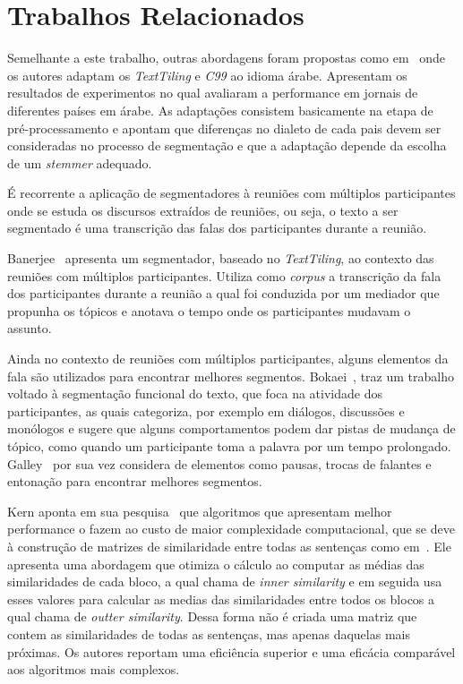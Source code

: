 \section{Trabalhos Relacionados}
	\label{sec:trabalhos}


Semelhante a este trabalho, outras abordagens foram propostas como em~\cite{CHAIBI2014} onde os autores adaptam os \textit{TextTiling} e \textit{C99} ao idioma árabe. Apresentam os resultados de experimentos no qual avaliaram a performance em jornais de diferentes países em árabe. As adaptações consistem basicamente na etapa de pré-processamento e apontam que diferenças no dialeto de cada pais devem ser consideradas no processo de segmentação e que a adaptação depende da escolha de um \textit{stemmer} adequado.

É recorrente a aplicação de segmentadores à reuniões com múltiplos participantes onde se estuda os discursos extraídos de reuniões, ou seja, o texto a ser segmentado é uma transcrição das falas dos participantes durante a reunião.
%


Banerjee~\cite{Banerjee2006} apresenta um segmentador, baseado no  \textit{TextTiling}, ao contexto das reuniões com múltiplos participantes. Utiliza como \textit{corpus} a transcrição da fala dos participantes durante a reunião a qual foi conduzida por um mediador que propunha os tópicos e anotava o tempo onde os participantes mudavam o assunto. 

Ainda no contexto de reuniões com múltiplos participantes, alguns elementos da fala são utilizados para encontrar melhores segmentos.
%
Bokaei~\cite{Bokaei2015}, traz um trabalho voltado à segmentação funcional do texto, que foca na atividade dos participantes, as quais categoriza, por exemplo em diálogos, discussões e monólogos e sugere que alguns comportamentos podem dar pistas de mudança de tópico, como quando um participante toma a palavra por um tempo prolongado. 
Galley~\cite{Galley2003} por sua vez considera de elementos como pausas, trocas de falantes e entonação para encontrar melhores segmentos.

Kern aponta em sua pesquisa~\cite{Kern2009} que algoritmos que apresentam melhor performance o fazem ao custo de maior complexidade computacional, que se deve à construção de matrizes de similaridade entre todas as sentenças como em~\cite{Choi2000}. Ele apresenta uma abordagem que otimiza o cálculo ao computar as médias das similaridades de cada bloco, a qual chama de \textit{inner similarity} e em seguida usa esses valores para calcular as medias das similaridades entre todos os blocos a qual chama de \textit{outter similarity}. Dessa forma não é criada uma matriz que contem as similaridades de todas as sentenças, mas apenas daquelas mais próximas. Os autores reportam uma eficiência superior e uma eficácia comparável aos algoritmos mais complexos.


